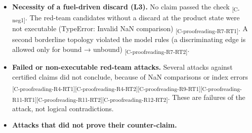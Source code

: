 \documentclass[
  english,
  twocolumn,
  10pt]{article}
\providecommand{\tightlist}{%
  \setlength{\itemsep}{0pt}\setlength{\parskip}{0pt}}
\begin{document}
\begin{itemize}
\tightlist
\item
  \textbf{Necessity of a fuel-driven discard (L3).} No claim passed the
  check \textsubscript{[C-neg1]}. The red-team candidates without a
  discard at the product state were not executable (TypeError: Invalid
  NaN comparison) \textsubscript{[C-proofreading-R7-RT1]}. A second
  borderline topology violated the model rules (a discriminating edge is
  allowed only for bound → unbound)
  \textsubscript{[C-proofreading-R7-RT2]}.
\item
  \textbf{Failed or non-executable red-team attacks.} Several attacks
  against certified claims did not conclude, because of NaN comparisons
  or index errors
  \textsubscript{[C-proofreading-R4-RT1]}\textsubscript{[C-proofreading-R4-RT2]}\textsubscript{[C-proofreading-R9-RT1]}\textsubscript{[C-proofreading-R11-RT1]}\textsubscript{[C-proofreading-R11-RT2]}\textsubscript{[C-proofreading-R12-RT2]}.
  These are failures of the attack, not logical contradictions.
\item
  \textbf{Attacks that did not prove their counter-claim.}


\end{itemize}
\end{document}

